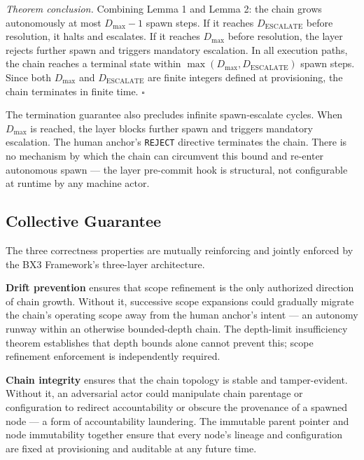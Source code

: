 \medskip
\textit{Theorem conclusion.} Combining Lemma 1 and Lemma 2: the chain grows autonomously at most $D_{\mathrm{max}} - 1$ spawn steps. If it reaches $D_{\mathrm{ESCALATE}}$ before resolution, it halts and escalates. If it reaches $D_{\mathrm{max}}$ before resolution, the \fact{} layer rejects further spawn and triggers mandatory escalation. In all execution paths, the chain reaches a terminal state within $\max(D_{\mathrm{max}}, D_{\mathrm{ESCALATE}})$ spawn steps. Since both $D_{\mathrm{max}}$ and $D_{\mathrm{ESCALATE}}$ are finite integers defined at provisioning, the chain terminates in finite time. $\square$

The termination guarantee also precludes infinite spawn-escalate cycles. When $D_{\mathrm{max}}$ is reached, the \fact{} layer blocks further spawn and triggers mandatory escalation. The human anchor's \texttt{REJECT} directive terminates the chain. There is no mechanism by which the chain can circumvent this bound and re-enter autonomous spawn --- the \fact{} layer pre-commit hook is structural, not configurable at runtime by any machine actor.

\subsection{Collective Guarantee}
\label{sec:collective_guarantee}

The three correctness properties are mutually reinforcing and jointly enforced by the BX3 Framework's three-layer architecture.

\textbf{Drift prevention} ensures that scope refinement is the only authorized direction of chain growth. Without it, successive scope expansions could gradually migrate the chain's operating scope away from the human anchor's intent --- an autonomy runway within an otherwise bounded-depth chain. The depth-limit insufficiency theorem establishes that depth bounds alone cannot prevent this; scope refinement enforcement is independently required.

\textbf{Chain integrity} ensures that the chain topology is stable and tamper-evident. Without it, an adversarial actor could manipulate chain parentage or configuration to redirect accountability or obscure the provenance of a spawned node --- a form of accountability laundering. The immutable parent pointer and node immutability together ensure that every node's lineage and configuration are fixed at provisioning and auditable at any future time.

